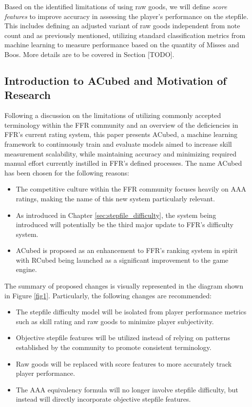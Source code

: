 \vspace{2mm}

Based on the identified limitations of using raw goods, we will define \textit{score features} to improve accuracy in assessing the player's performance on the stepfile. This includes defining an adjusted variant of raw goods independent from note count and as previously mentioned, utilizing standard classification metrics from machine learning to measure performance based on the quantity of Misses and Boos. More details are to be covered in Section [TODO].

\subsection{Introduction to ACubed and Motivation of Research}

Following a discussion on the limitations of utilizing commonly accepted terminology within the FFR community and an overview of the deficiencies in FFR's current rating system, this paper presents ACubed, a machine learning framework to continuously train and evaluate models aimed to increase skill measurement scalability, while maintaining accuracy and minimizing required manual effort currently instilled in FFR's defined processes. The name ACubed has been chosen for the following reasons:

\begin{itemize}
	\item The competitive culture within the FFR community focuses heavily on AAA ratings, making the name of this new system particularly relevant.
	\item As introduced in Chapter \ref{sec:stepfile_difficulty}, the system being introduced will potentially be the third major update to FFR's difficulty system.
	\item ACubed is proposed as an enhancement to FFR's ranking system in spirit with RCubed being launched as a significant improvement to the game engine.
\end{itemize}

The summary of proposed changes is visually represented in the diagram shown in Figure \ref{fig1}. Particularly, the following changes are recommended:


\begin{itemize}
	\item The stepfile difficulty model will be isolated from player performance metrics such as skill rating and raw goods to minimize player subjectivity.
	\item Objective stepfile features will be utilized instead of relying on patterns established by the community to promote consistent terminology.
	\item Raw goods will be replaced with score features to more accurately track player performance.
	\item The AAA equivalency formula will no longer involve stepfile difficulty, but instead will directly incorporate objective stepfile features.
\end{itemize}


